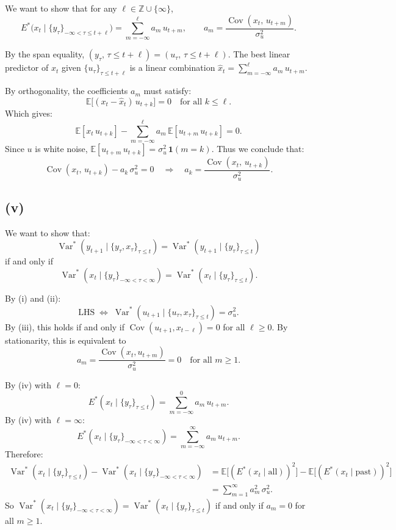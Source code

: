 \documentclass[11pt]{article}
\newcommand{\Var}{\operatorname{Var}}
\newcommand{\Cov}{\operatorname{Cov}}
\newcommand{\E}{\mathbb{E}}
\newcommand{\Z}{\mathbb{Z}}
\begin{document}
We want to show that for any $\ell \in \Z \cup \{\infty\}$,
\[
E^*\bigl(x_t \mid \{y_\tau\}_{-\infty<\tau\le t+\ell}\bigr) = \sum_{m=-\infty}^{\ell} a_m\, u_{t+m}, \qquad a_m = \frac{\Cov(x_t,\,u_{t+m})}{\sigma_u^2}.
\]

By the span equality, $(y_\tau,\,\tau\le t+\ell) = (u_\tau,\,\tau\le t+\ell)$. The best linear predictor of $x_t$ given $\{u_\tau\}_{\tau\le t+\ell}$ is a linear combination $\hat{x}_t = \sum_{m=-\infty}^{\ell} a_m\,u_{t+m}$.

By orthogonality, the coefficients $a_m$ must satisfy:
\[
\E\bigl[(x_t - \hat{x}_t)\,u_{t+k}\bigr] = 0 \quad \text{for all } k \le \ell.
\]
Which gives:
\[
\E[x_t\,u_{t+k}] - \sum_{m=-\infty}^{\ell} a_m\, \E[u_{t+m}\,u_{t+k}] = 0.
\]
Since $u$ is white noise, $\E[u_{t+m}\,u_{t+k}] = \sigma_u^2\,\mathbf{1}(m=k)$. Thus we conclude that:
\[
\Cov(x_t,\,u_{t+k}) - a_k\,\sigma_u^2 = 0 \quad \Longrightarrow \quad a_k = \frac{\Cov(x_t,\,u_{t+k})}{\sigma_u^2}.
\]

\subsection{(v)}

We want to show that:
\[
\Var^*(y_{t+1} \mid \{y_\tau,x_\tau\}_{\tau\le t}) = \Var^*(y_{t+1} \mid \{y_\tau\}_{\tau\le t})
\]
if and only if
\[
\Var^*(x_t \mid \{y_\tau\}_{-\infty<\tau<\infty}) = \Var^*(x_t \mid \{y_\tau\}_{\tau\le t}).
\]

By (i) and (ii):
\[
\text{LHS} \;\Longleftrightarrow\; \Var^*(u_{t+1} \mid \{u_\tau,x_\tau\}_{\tau\le t}) = \sigma_u^2.
\]
By (iii), this holds if and only if $\Cov(u_{t+1}, x_{t-\ell}) = 0$ for all $\ell \ge 0$. By stationarity, this is equivalent to
\begin{equation}\label{eq:cond}
a_m = \frac{\Cov(x_t, u_{t+m})}{\sigma_u^2} = 0 \quad \text{for all } m \ge 1.
\end{equation}

By (iv) with $\ell = 0$:
\[
E^*(x_t \mid \{y_\tau\}_{\tau\le t}) = \sum_{m=-\infty}^{0} a_m\, u_{t+m}.
\]
By (iv) with $\ell = \infty$:
\[
E^*(x_t \mid \{y_\tau\}_{-\infty<\tau<\infty}) = \sum_{m=-\infty}^{\infty} a_m\, u_{t+m}.
\]
Therefore:
\begin{align*}
\Var^*(x_t \mid \{y_\tau\}_{\tau\le t}) - \Var^*(x_t \mid \{y_\tau\}_{-\infty<\tau<\infty})
&= \E\bigl[(E^*(x_t \mid \text{all}))^2\bigr] - \E\bigl[(E^*(x_t \mid \text{past}))^2\bigr] \\
&= \sum_{m=1}^{\infty} a_m^2\,\sigma_u^2.
\end{align*}
So $\Var^*(x_t \mid \{y_\tau\}_{-\infty<\tau<\infty}) = \Var^*(x_t \mid \{y_\tau\}_{\tau\le t})$ if and only if $a_m = 0$ for all $m \ge 1$.
\end{document}
